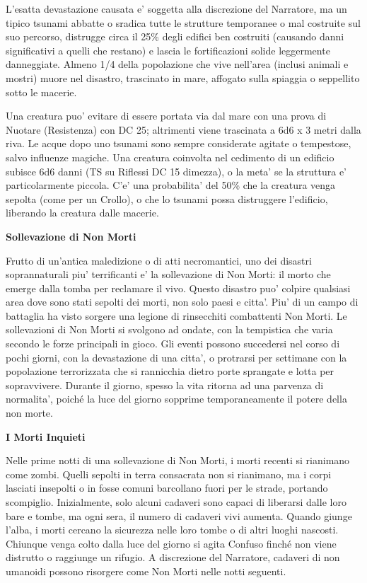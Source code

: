 \documentclass[a4paper,11pt,twoside,openany]{dndbook}
\begin{document}
L'esatta devastazione causata e' soggetta alla discrezione del Narratore, ma un tipico tsunami abbatte o sradica tutte le strutture temporanee o mal costruite sul suo percorso, distrugge circa il 25\% degli edifici ben costruiti (causando danni significativi a quelli che restano) e lascia le fortificazioni solide leggermente danneggiate. Almeno 1/4 della popolazione che vive nell'area (inclusi animali e mostri) muore nel disastro, trascinato in mare, affogato sulla spiaggia o seppellito sotto le macerie.

Una creatura puo' evitare di essere portata via dal mare con una prova di Nuotare (Resistenza) con DC 25; altrimenti viene trascinata a 6d6 x 3 metri dalla riva. Le acque dopo uno tsunami sono sempre considerate agitate o tempestose, salvo influenze magiche. Una creatura coinvolta nel cedimento di un edificio subisce 6d6 danni (TS su Riflessi DC 15 dimezza), o la meta' se la struttura e' particolarmente piccola. C'e' una probabilita' del 50\% che la creatura venga sepolta (come per un Crollo), o che lo tsunami possa distruggere l'edificio, liberando la creatura dalle macerie.

\textbf{Sollevazione di Non Morti}

Frutto di un'antica maledizione o di atti necromantici, uno dei disastri soprannaturali piu' terrificanti e' la sollevazione di Non Morti: il morto che emerge dal­la tomba per reclamare il vivo. Questo disastro puo' colpire qualsiasi area dove sono stati sepolti dei morti, non solo paesi e citta'. Piu' di un campo di battaglia ha visto sorgere una legione di rinsecchiti combattenti Non Morti. Le sollevazioni di Non Morti si svolgono ad ondate, con la tempistica che varia secondo le forze principali in gioco. Gli eventi possono succedersi nel corso di pochi giorni, con la devastazione di una citta', o protrarsi per settimane con la popolazione terrorizzata che si rannicchia dietro porte sprangate e lotta per sopravvivere. Durante il giorno, spesso la vita ritorna ad una parvenza di normalita', poiché la luce del giorno sopprime temporaneamente il potere della non morte.

\textbf{I Morti Inquieti}

Nelle prime notti di una sollevazione di Non Morti, i morti recenti si rianimano come zombi. Quelli sepolti in terra consacrata non si rianimano, ma i corpi lasciati insepolti o in fosse comuni barcollano fuori per le strade, portando scompiglio. Inizialmente, solo alcuni cadaveri sono capaci di liberarsi dal­le loro bare e tombe, ma ogni sera, il numero di cadaveri vivi aumenta. Quando giunge l'alba, i morti cercano la sicurezza nelle loro tombe o di altri luoghi nascosti. Chiunque venga colto dalla luce del giorno si agita Confuso finché non viene distrutto o raggiunge un rifugio. A discrezione del Narratore, cadaveri di non umanoidi possono risorgere come Non Morti nelle notti seguenti.
\end{document}
